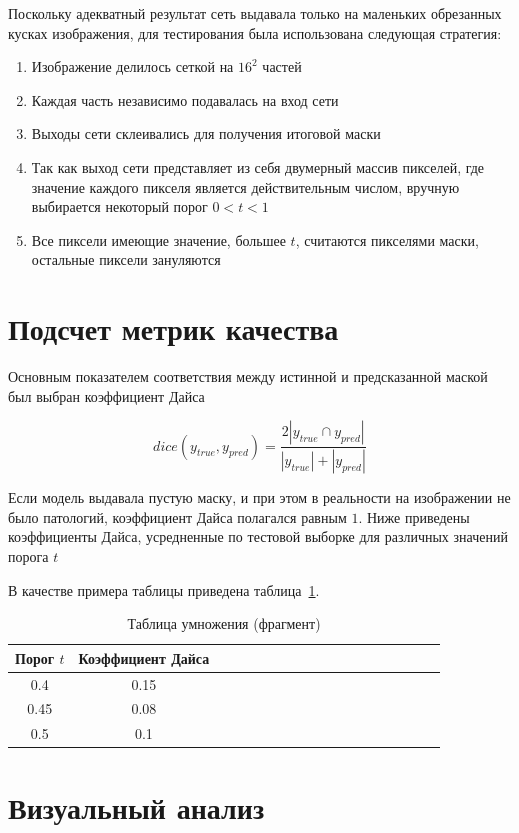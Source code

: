 Поскольку адекватный результат сеть выдавала только на маленьких обрезанных кусках изображения, для тестирования была использована следующая стратегия:

\begin{enumerate}
    \item Изображение делилось сеткой на $16^2$ частей
    \item Каждая часть независимо подавалась на вход сети
    \item Выходы сети склеивались для получения итоговой маски
    \item Так как выход сети представляет из себя двумерный массив пикселей, где значение каждого пикселя является действительным числом, вручную выбирается некоторый порог $0 < t < 1$
    \item Все пиксели имеющие значение, большее $t$, считаются пикселями маски, остальные пиксели зануляются
\end{enumerate}



\section{Подсчет метрик качества}

Основным показателем соответствия между истинной и предсказанной маской был выбран коэффициент Дайса

$$ dice(y_{true}, y_{pred}) = \dfrac{2|y_{true} \cap y_{pred}|}{ |y_{true}| + |y_{pred}|} $$

Если модель выдавала пустую маску, и при этом в реальности на изображении не было патологий, коэффициент Дайса полагался равным $1$. Ниже приведены коэффициенты Дайса, усредненные по тестовой выборке для различных значений порога $t$ 

В качестве примера таблицы приведена таблица~\ref{tab1}.

\begin{table}[!h]
\caption{Таблица умножения (фрагмент)}\label{tab1}
\centering
\begin{tabular}{|*{18}{c|}}\hline
\textbf{Порог $t$} & \textbf{Коэффициент Дайса} \\\hline
0.4 & 0.15 \\\hline
0.45 & 0.08 \\\hline
0.5 & 0.1 \\\hline
\end{tabular}
\end{table}

\section{Визуальный анализ}

